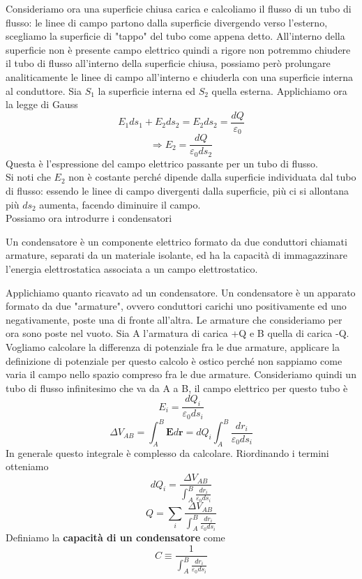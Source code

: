 \documentclass[
10pt, %
a4paper, %
oneside, %
headinclude,footinclude, %
BCOR5mm, %
]{scrartcl}
\begin{document}
Consideriamo ora una superficie chiusa carica e calcoliamo il flusso di un tubo di flusso: le linee di campo partono dalla superficie divergendo verso l'esterno, scegliamo la superficie di "tappo" del tubo come appena detto. All'interno della superficie non è presente campo elettrico quindi a rigore non potremmo chiudere il tubo di flusso all'interno della superficie chiusa, possiamo però prolungare analiticamente le linee di campo all'interno e chiuderla con una superficie interna al conduttore. Sia \(S_1\) la superficie interna ed \(S_2\) quella esterna. Applichiamo ora la legge di Gauss
\[E_1ds_1+E_2ds_2 = E_2ds_2 = \frac{dQ}{\varepsilon_0}\]
\[\Rightarrow E_2 = \frac{dQ}{\varepsilon_0 ds_2}\]
Questa è l'espressione del campo elettrico passante per un tubo di flusso.\\
Si noti che \(E_2\) non è costante perché dipende dalla superficie individuata dal tubo di flusso: essendo le linee di campo divergenti dalla superficie, più ci si allontana più \(ds_2\) aumenta, facendo diminuire il campo.\\
Possiamo ora introdurre i condensatori
\begin{definizione}[Condensatore]
	Un condensatore è un componente elettrico formato da due conduttori chiamati armature, separati da un materiale isolante, ed ha la capacità di immagazzinare l'energia elettrostatica associata a un campo elettrostatico.
\end{definizione}
Applichiamo quanto ricavato ad un condensatore. Un condensatore è un apparato formato da due "armature", ovvero conduttori carichi uno positivamente ed uno negativamente, poste una di fronte all'altra. Le armature che consideriamo per ora sono poste nel vuoto. Sia A l'armatura di carica +Q e B quella di carica -Q. Vogliamo calcolare la differenza di potenziale fra le due armature, applicare la definizione di potenziale per questo calcolo è ostico perché non sappiamo come varia il campo nello spazio compreso fra le due armature. Consideriamo quindi un tubo di flusso infinitesimo che va da A a B, il campo elettrico per questo tubo è
\[E_i  = \frac{dQ_i}{\varepsilon_0 ds_i}\]
\[\Delta V_{AB} = \int_{A}^{B}\mathbf{E}d\mathbf{r} =dQ_i \int_{A}^{B}\frac{dr_i}{\varepsilon_0 ds_i}\]
In generale questo integrale è complesso da calcolare. Riordinando i termini otteniamo
\[dQ_i = \frac{\Delta V_{AB}}{\int_{A}^{B}\frac{dr_i}{\varepsilon_0 ds_i}}\]
\[Q = \sum_i\frac{\Delta V_{AB}}{\int_{A}^{B}\frac{dr_i}{\varepsilon_0 ds_i}}\]
Definiamo la \textbf{capacità di un condensatore} come
\[C\equiv \frac{1}{{ \int_{A}^{B}\frac{dr_i}{\varepsilon_0 ds_i}}}\]
\end{document}

